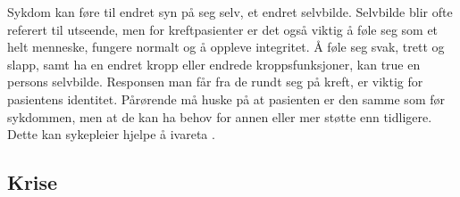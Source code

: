Sykdom kan føre til endret syn på seg selv, et endret
selvbilde. Selvbilde blir ofte referert til utseende, men for kreftpasienter er
det også viktig å føle seg som et helt menneske, fungere normalt og å oppleve
integritet. Å føle seg svak, trett og slapp, samt ha en endret kropp eller
endrede kroppsfunksjoner, kan true en persons selvbilde. Responsen man får fra
de rundt seg på kreft, er viktig for pasientens identitet. Pårørende må huske
på at pasienten er den samme som før sykdommen, men at de kan ha behov for
annen eller mer støtte enn tidligere. Dette kan sykepleier hjelpe å ivareta
\cite[s.~42-43]{rustoen2008}.

\subsection{Krise}

